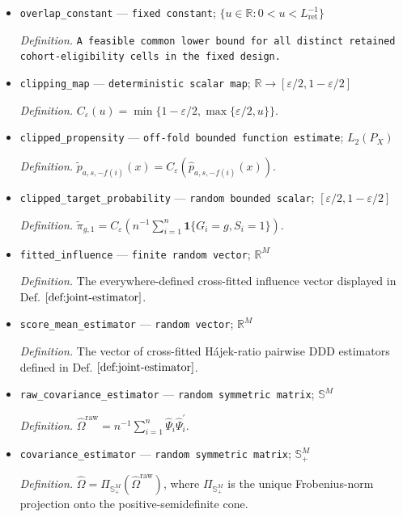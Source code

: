 \documentclass{article}
\begin{document}
\begin{itemize}
  \item \texttt{overlap\_\allowbreak{}constant} --- \texttt{fixed constant}; \(\{u\in\mathbb R:0<u<L_{\mathrm{ret}}^{-1}\}\)
  \par\smallskip\noindent\emph{Definition.} \texttt{A feasible common lower bound for all distinct retained cohort-\allowbreak{}eligibility cells in the fixed design.}
  \item \texttt{clipping\_\allowbreak{}map} --- \texttt{deterministic scalar map}; \(\mathbb R\to[\varepsilon/2,1-\varepsilon/2]\)
  \par\smallskip\noindent\emph{Definition.} \(C_\varepsilon(u)=\min\{1-\varepsilon/2,\max\{\varepsilon/2,u\}\}\).
  \item \texttt{clipped\_\allowbreak{}propensity} --- \texttt{off-\allowbreak{}fold bounded function estimate}; \(L_2(P_X)\)
  \par\smallskip\noindent\emph{Definition.} \(\widetilde p_{a,s,-f(i)}(x)=C_\varepsilon(\widehat p_{a,s,-f(i)}(x))\).
  \item \texttt{clipped\_\allowbreak{}target\_\allowbreak{}probability} --- \texttt{random bounded scalar}; \([\varepsilon/2,1-\varepsilon/2]\)
  \par\smallskip\noindent\emph{Definition.} \(\widetilde\pi_{g,1}=C_\varepsilon(n^{-1}\sum_{i=1}^n\mathbf 1\{G_i=g,S_i=1\})\).
  \item \texttt{fitted\_\allowbreak{}influence} --- \texttt{finite random vector}; \(\mathbb R^M\)
  \par\smallskip\noindent\emph{Definition.} The everywhere-defined cross-fitted influence vector displayed in \(\mathrm{Def.}\) \(\ref{def:joint-estimator}\).
  \item \texttt{score\_\allowbreak{}mean\_\allowbreak{}estimator} --- \texttt{random vector}; \(\mathbb R^M\)
  \par\smallskip\noindent\emph{Definition.} The vector of cross-fitted Hájek-ratio pairwise DDD estimators defined in \(\mathrm{Def.}\) \(\ref{def:joint-estimator}\).
  \item \texttt{raw\_\allowbreak{}covariance\_\allowbreak{}estimator} --- \texttt{random symmetric matrix}; \(\mathbb S^M\)
  \par\smallskip\noindent\emph{Definition.} \(\widehat\Omega^{\mathrm{raw}}=n^{-1}\sum_{i=1}^n\widehat\Psi_i\widehat\Psi_i^{\prime}\).
  \item \texttt{covariance\_\allowbreak{}estimator} --- \texttt{random symmetric matrix}; \(\mathbb S_+^M\)
  \par\smallskip\noindent\emph{Definition.} \(\widehat\Omega=\Pi_{\mathbb S_+^M}(\widehat\Omega^{\mathrm{raw}})\), where \(\Pi_{\mathbb S_+^M}\) is the unique Frobenius-norm projection onto the positive-semidefinite cone.

\end{itemize}
\end{document}
